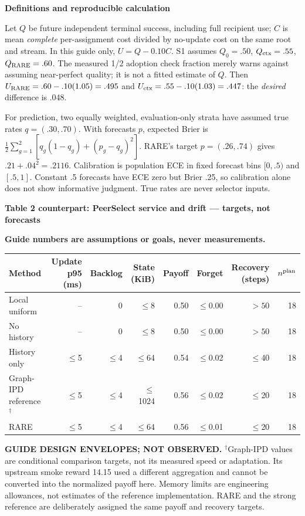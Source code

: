 \documentclass[10pt,a4paper]{article}
\newcommand{\metric}[1]{\makecell[c]{#1}}
\newcommand{\status}{\textcolor{red!70!black}{\textbf{Guide numbers are assumptions or goals, never measurements.}}\par}
\newcommand{\lead}[1]{\vspace{4pt}\textbf{#1}\par}
\begin{document}
\lead{Definitions and reproducible calculation}
Let $Q$ be future independent terminal success, including full recipient use;
$C$ is mean \emph{complete} per-assignment cost divided by no-update cost on the
same root and stream. In this guide only, $U=Q-0.10C$. S1 assumes
$Q_0=.50$, $Q_{\rm ctx}=.55$, $Q_{\rm RARE}=.60$. The measured 1/2 adoption
check fraction merely warns against assuming near-perfect quality; it is not
a fitted estimate of $Q$. Then $U_{\rm RARE}=.60-.10(1.05)=.495$ and
$U_{\rm ctx}=.55-.10(1.03)=.447$: the \emph{desired} difference is .048.

For prediction, two equally weighted, evaluation-only strata have assumed true
rates $q=(.30,.70)$. With forecasts $p$, expected Brier is
$\frac12\sum_{g=1}^2[q_g(1-q_g)+(p_g-q_g)^2]$.
RARE's target $p=(.26,.74)$ gives $.21+.04^2=.2116$.
Calibration is population ECE in fixed forecast bins $[0,.5)$ and $[.5,1]$.
Constant .5 forecasts have ECE zero but Brier .25, so calibration alone does
not show informative judgment. True rates are never selector inputs.

\clearpage
\lead{Table 2 counterpart: PeerSelect service and drift --- targets, not forecasts}
\status
\begin{center}\small
\begin{tabular*}{\linewidth}{@{\extracolsep{\fill}}lrrrrrrr@{}}\toprule
Method & \metric{Update p95\\(ms)} & Backlog & \metric{State\\(KiB)} & Payoff & Forget & \metric{Recovery\\(steps)} & $n^{\rm plan}$\\\midrule
Local uniform & -- & 0 & $\leq$8 & 0.50 & $\leq$0.00 & $>50$ & 18\\
No history & -- & 0 & $\leq$8 & 0.50 & $\leq$0.00 & $>50$ & 18\\
History only & $\leq$5 & $\leq$4 & $\leq$64 & 0.54 & $\leq$0.02 & $\leq$40 & 18\\
Graph-IPD reference$^{\dagger}$ & $\leq$5 & $\leq$4 & $\leq$1024 & 0.56 & $\leq$0.02 & $\leq$20 & 18\\
RARE & $\leq$5 & $\leq$4 & $\leq$64 & 0.56 & $\leq$0.01 & $\leq$20 & 18\\
\bottomrule\end{tabular*}\end{center}
\textbf{GUIDE DESIGN ENVELOPES; NOT OBSERVED.} $^{\dagger}$Graph-IPD values are
conditional comparison targets, not its measured speed or adaptation. Its
upstream smoke reward 14.15 used a different aggregation and cannot be converted
into the normalized payoff here. Memory limits are engineering allowances,
not estimates of the reference implementation. RARE and the strong reference
are deliberately assigned the same payoff and recovery targets.
\end{document}
